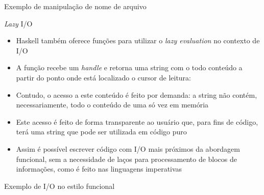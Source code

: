 \begin{frame}[fragile]{Exemplo de manipulação de nome de arquivo}
\end{frame}

\begin{frame}[fragile]{\textit{Lazy} I/O}

    \begin{itemize}
        \item Haskell também oferece funções para utilizar o \textit{lazy evaluation} no contexto
            de I/O

        \item A função  recebe um \textit{handle} e retorna uma
            string com o todo conteúdo a partir do ponto onde está localizado o cursor de
            leitura:


        \item Contudo, o acesso a este conteúdo é feito por demanda: a string não contém, 
            necessariamente, todo o conteúdo de uma só vez em memória

        \item Este acesso é feito de forma transparente ao usuário que, para fins de código,
            terá uma string que pode ser utilizada em código puro

        \item  Assim é possível escrever código com I/O mais próximos da abordagem funcional,
            sem a necessidade de laços para processamento de blocos de informações, como é feito
            nas linguagens imperativas
    \end{itemize}

\end{frame}

\begin{frame}[fragile]{Exemplo de I/O no estilo funcional}
\end{frame}

